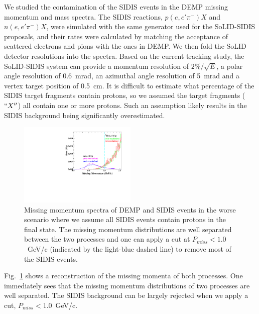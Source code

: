 We studied the contamination of the SIDIS events in the DEMP missing momentum
and mass spectra. The SIDIS reactions, $p(e,e'\pi^{-})X$ and $n(e,e'\pi^{-})X$,
were simulated with the same generator used for the SoLID-SIDIS proposals, and
their rates were calculated by matching the acceptance of scattered electrons
and pions with the ones in DEMP. We then fold the SoLID detector resolutions
into the spectra. Based on the current tracking study, the SoLID-SIDIS system
can provide a momentum resolution of $2\%/\sqrt{E}$, a polar angle
resolution of 0.6~mrad, an azimuthal angle resolution of 5~mrad and a
vertex target position of 0.5~cm. It is difficult to estimate what
percentage of the SIDIS target fragments contain protons, so we assumed
the target fragments ($``X''$) all contain one or more protons. Such an
assumption likely results in the SIDIS background being significantly
overestimated.

\begin{figure}[!ht]
\begin{center}
\includegraphics[type=pdf,ext=.pdf,read=.pdf,width=0.5\textwidth]
{./figures/Missing_P_Fermi_Rad_02Hz}
\caption[Missing Momentum]{\footnotesize{Missing momentum spectra of DEMP and
SIDIS events in the worse scenario where we assume all SIDIS events contain protons in the final state. 
The missing momentum distributions are well separated between the
two processes and one can apply a cut at $P_{miss}<1.0$~GeV/c (indicated by the
light-blue dashed line) to remove most of the SIDIS events. }}
  \label{missing_mom}
  \end{center}
\end{figure}

Fig.~\ref{missing_mom} shows a reconstruction of the missing momenta of both
processes. One immediately sees that the missing momentum distributions of two
processes are well separated.  The SIDIS background can be largely rejected
when we apply a cut, $P_{miss}<1.0$~GeV/c. 

